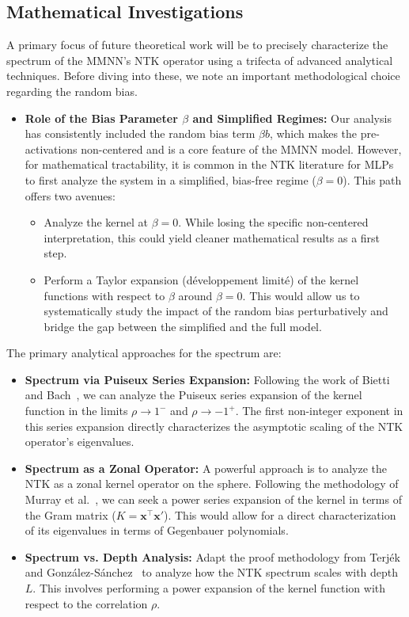 \documentclass[12pt]{article}
\begin{document}
\subsection{Mathematical Investigations}
A primary focus of future theoretical work will be to precisely characterize the spectrum of the MMNN's NTK operator using a trifecta of advanced analytical techniques. Before diving into these, we note an important methodological choice regarding the random bias.
\begin{itemize}
    \item \textbf{Role of the Bias Parameter $\beta$ and Simplified Regimes:} Our analysis has consistently included the random bias term $\beta b$, which makes the pre-activations non-centered and is a core feature of the MMNN model. However, for mathematical tractability, it is common in the NTK literature for MLPs to first analyze the system in a simplified, bias-free regime ($\beta=0$). This path offers two avenues:
        \begin{itemize}
            \item Analyze the kernel at $\beta=0$. While losing the specific non-centered interpretation, this could yield cleaner mathematical results as a first step.
            \item Perform a Taylor expansion (développement limité) of the kernel functions with respect to $\beta$ around $\beta=0$. This would allow us to systematically study the impact of the random bias perturbatively and bridge the gap between the simplified and the full model.
        \end{itemize}
\end{itemize}
The primary analytical approaches for the spectrum are:
\begin{itemize}
    \item \textbf{Spectrum via Puiseux Series Expansion:} Following the work of Bietti and Bach~\cite{bietti2021deepequalsshallowrelu}, we can analyze the Puiseux series expansion of the kernel function in the limits $\rho \to 1^-$ and $\rho \to -1^+$. The first non-integer exponent in this series expansion directly characterizes the asymptotic scaling of the NTK operator's eigenvalues.
    \item \textbf{Spectrum as a Zonal Operator:} A powerful approach is to analyze the NTK as a zonal kernel operator on the sphere. Following the methodology of Murray et al.~\cite{murray2023characterizingspectrumntkpower}, we can seek a power series expansion of the kernel in terms of the Gram matrix ($K = \bm{x}^\top\bm{x}'$). This would allow for a direct characterization of its eigenvalues in terms of Gegenbauer polynomials.
    \item \textbf{Spectrum vs. Depth Analysis:} Adapt the proof methodology from Terj\'{e}k and Gonz\'{a}lez-S\'{a}nchez~\cite{terjek2025mlpseocspectrumntk} to analyze how the NTK spectrum scales with depth $L$. This involves performing a power expansion of the kernel function with respect to the correlation $\rho$.
\end{itemize}
\end{document}
